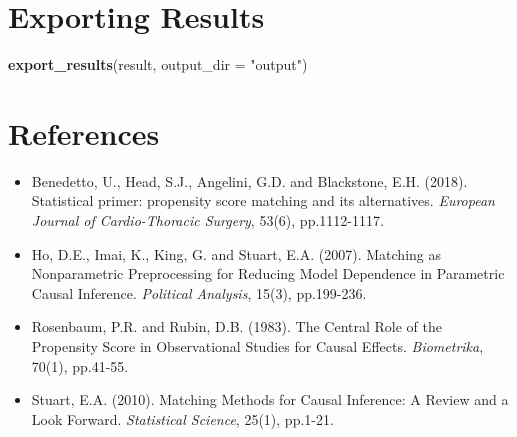 \documentclass[
]{article}
\newenvironment{Shaded}{\begin{snugshade}}{\end{snugshade}}
\newcommand{\AttributeTok}[1]{\textcolor[rgb]{0.13,0.29,0.53}{#1}}
\newcommand{\FunctionTok}[1]{\textcolor[rgb]{0.13,0.29,0.53}{\textbf{#1}}}
\newcommand{\NormalTok}[1]{#1}
\newcommand{\StringTok}[1]{\textcolor[rgb]{0.31,0.60,0.02}{#1}}
\begin{document}
\section{Exporting Results}\label{exporting-results}

\begin{Shaded}
\begin{Highlighting}[]
\FunctionTok{export\_results}\NormalTok{(result, }\AttributeTok{output\_dir =} \StringTok{"output"}\NormalTok{)}
\end{Highlighting}
\end{Shaded}

\newpage

\section{References}\label{references}

\begin{itemize}
\item
  Benedetto, U., Head, S.J., Angelini, G.D. and Blackstone, E.H. (2018).
  Statistical primer: propensity score matching and its alternatives.
  \emph{European Journal of Cardio-Thoracic Surgery}, 53(6),
  pp.1112-1117.
\item
  Ho, D.E., Imai, K., King, G. and Stuart, E.A. (2007). Matching as
  Nonparametric Preprocessing for Reducing Model Dependence in
  Parametric Causal Inference. \emph{Political Analysis}, 15(3),
  pp.199-236.
\item
  Rosenbaum, P.R. and Rubin, D.B. (1983). The Central Role of the
  Propensity Score in Observational Studies for Causal Effects.
  \emph{Biometrika}, 70(1), pp.41-55.
\item
  Stuart, E.A. (2010). Matching Methods for Causal Inference: A Review
  and a Look Forward. \emph{Statistical Science}, 25(1), pp.1-21.
\end{itemize}
\end{document}
